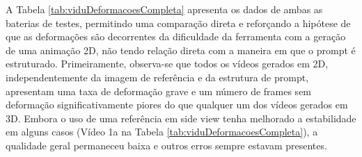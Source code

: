 \begin{table}[htbp]
    \centering
    \caption{Análise quantitativa de frames com deformação, comparando testes com referência em front e side view.}
    \label{tab:viduDeformacoesCompleta}
\end{table}

A Tabela \ref{tab:viduDeformacoesCompleta} apresenta os dados de ambas as baterias de testes, permitindo uma comparação direta e reforçando a hipótese de que as deformações são decorrentes da dificuldade da ferramenta com a geração de uma animação 2D, não tendo relação direta com a maneira em que o prompt é estruturado. Primeiramente, observa-se que todos os vídeos gerados em 2D, independentemente da imagem de referência e da estrutura de prompt, apresentam uma taxa de deformação grave e um número de frames sem deformação significativamente piores do que qualquer um dos vídeos gerados em 3D. Embora o uso de uma referência em side view tenha melhorado a estabilidade em alguns casos (Vídeo 1a na Tabela \ref{tab:viduDeformacoesCompleta}), a qualidade geral permaneceu baixa e outros erros sempre estavam presentes.

